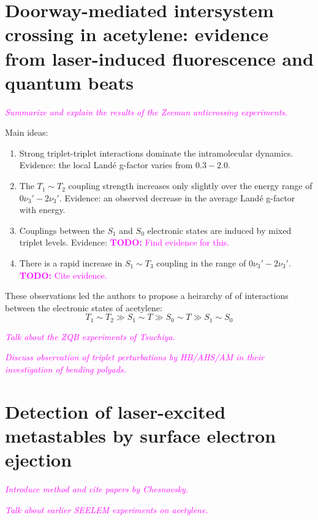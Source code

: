 \documentclass[12pt]{mitthesis}
\newcommand{\TODO} [1]{\textcolor{magenta}{\textbf{TODO:} #1}}
\newcommand{\POINT}[1]{\textcolor{magenta}{\emph{#1}}}
\begin{document}
\section{Doorway-mediated intersystem crossing in acetylene: evidence
  from laser-induced fluorescence and quantum beats}

\POINT{Summarize and explain the results of the Zeeman anticrossing
  experiments.} 

Main ideas:
\begin{enumerate}

\item Strong triplet-triplet interactions dominate the intramolecular
  dynamics.  Evidence: the local Land\'{e} g-factor varies from
  $0.3-2.0$.

\item The $T_1 \sim T_2$ coupling strength increases only slightly over
  the energy range of $0\nu_3'-2\nu_3'$.  Evidence: an observed
  decrease in the average Land\'{e} g-factor with energy.

\item Couplings between the $S_1$ and $S_0$ electronic states are
  induced by mixed triplet levels.  Evidence: \TODO{Find evidence for
    this.}

\item There is a rapid increase in $S_1 \sim T_3$ coupling in the range of
  $0\nu_3'-2\nu_3'$. \TODO{Cite evidence.}

\end{enumerate}
These observations led the authors to propose a heirarchy of of
interactions between the electronic states of acetylene:
\begin{equation}
  T_1 \sim T_2 \gg S_1 \sim T \gg S_0 \sim T \gg S_1 \sim S_0
\end{equation}

\POINT{Talk about the ZQB experiments of Tsuchiya.}


\POINT{Discuss observation of triplet perturbations by HB/AHS/AM in
  their investigation of bending polyads.}


\section{Detection of laser-excited metastables by surface electron
  ejection}

\POINT{Introduce method and cite papers by Chesnovsky.}

\POINT{Talk about earlier SEELEM experiments on acetylene.}
\end{document}
